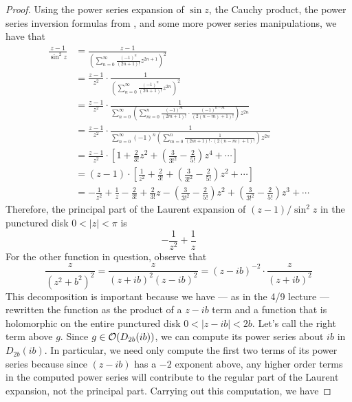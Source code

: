 \documentclass[../psets.tex]{subfiles}
\begin{document}
\begin{enumerate}[ref={A.\arabic*}]
\begin{proof}
        Using the power series expansion of $\sin z$, the Cauchy product, the power series inversion formulas from \textcite[51]{bib:FischerLieb}, and some more power series manipulations, we have that
        \begingroup
        \allowdisplaybreaks
        \begin{align*}
            \frac{z-1}{\sin^2z} &= \frac{z-1}{\left( \sum_{n=0}^\infty\frac{(-1)^n}{(2n+1)!}z^{2n+1} \right)^2}\\
            &= \frac{z-1}{z^2}\cdot\frac{1}{\left( \sum_{n=0}^\infty\frac{(-1)^n}{(2n+1)!}z^{2n} \right)^2}\\
            &= \frac{z-1}{z^2}\cdot\frac{1}{\sum_{n=0}^\infty\left( \sum_{m=0}^n\frac{(-1)^m}{(2m+1)!}\cdot\frac{(-1)^{n-m}}{(2(n-m)+1)!} \right)z^{2n}}\\
            &= \frac{z-1}{z^2}\cdot\frac{1}{\sum_{n=0}^\infty(-1)^n\left( \sum_{m=0}^n\frac{1}{(2m+1)!\cdot(2(n-m)+1)!} \right)z^{2n}}\\
            &= \frac{z-1}{z^2}\cdot\left[ 1+\frac{2}{3!}z^2+\left( \frac{3}{3!^2}-\frac{2}{5!} \right)z^4+\cdots \right]\\
            &= (z-1)\cdot\left[ \frac{1}{z^2}+\frac{2}{3!}+\left( \frac{3}{3!^2}-\frac{2}{5!} \right)z^2+\cdots \right]\\
            &= -\frac{1}{z^2}+\frac{1}{z}-\frac{2}{3!}+\frac{2}{3!}z-\left( \frac{3}{3!^2}-\frac{2}{5!} \right)z^2+\left( \frac{3}{3!^2}-\frac{2}{5!} \right)z^3+\cdots
        \end{align*}
        \endgroup
        Therefore, the principal part of the Laurent expansion of $(z-1)/\sin^2z$ in the punctured disk $0<|z|<\pi$ is
        \begin{equation*}
            \boxed{-\frac{1}{z^2}+\frac{1}{z}}
        \end{equation*}
        For the other function in question, observe that
        \begin{equation*}
            \frac{z}{(z^2+b^2)^2} = \frac{z}{(z+ib)^2(z-ib)^2}
            = (z-ib)^{-2}\cdot\frac{z}{(z+ib)^2}
        \end{equation*}
        This decomposition is important because we have --- as in the 4/9 lecture --- rewritten the function as the product of a $z-ib$ term and a function that is holomorphic on the entire punctured disk $0<|z-ib|<2b$. Let's call the right term above $g$. Since $g\in\mathcal{O}(D_{2b}(ib))$, we can compute its power series about $ib$ in $D_{2b}(ib)$. In particular, we need only compute the first two terms of its power series because since $(z-ib)$ has a $-2$ exponent above, any higher order terms in the computed power series will contribute to the regular part of the Laurent expansion, not the principal part. Carrying out this computation, we have

\end{proof}
\end{enumerate}
\end{document}
